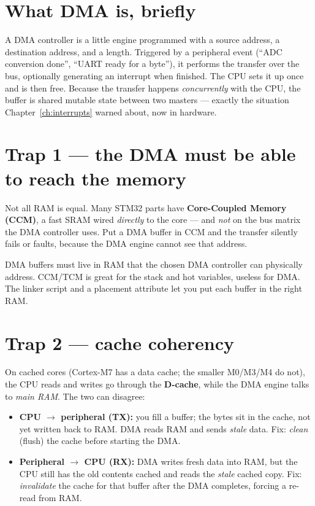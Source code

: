 \documentclass[11pt,a4paper,oneside]{book}
\begin{document}
\section{What DMA is, briefly}
A DMA controller is a little engine programmed with a source address, a
destination address, and a length. Triggered by a peripheral event (``ADC
conversion done'', ``UART ready for a byte''), it performs the transfer over the
bus, optionally generating an interrupt when finished. The CPU sets it up once
and is then free. Because the transfer happens \emph{concurrently} with the CPU,
the buffer is shared mutable state between two masters --- exactly the situation
Chapter~\ref{ch:interrupts} warned about, now in hardware.

\section{Trap 1 --- the DMA must be able to reach the memory}
Not all RAM is equal. Many STM32 parts have \textbf{Core-Coupled Memory (CCM)},
a fast SRAM wired \emph{directly} to the core --- and \emph{not} on the bus
matrix the DMA controller uses. Put a DMA buffer in CCM and the transfer
silently fails or faults, because the DMA engine cannot see that address.
\begin{keyidea}
DMA buffers must live in RAM that the chosen DMA controller can physically
address. CCM/TCM is great for the stack and hot variables, useless for DMA. The
linker script and a placement attribute let you put each buffer in the right
RAM.
\end{keyidea}

\section{Trap 2 --- cache coherency}
On cached cores (Cortex-M7 has a data cache; the smaller M0/M3/M4 do not), the
CPU reads and writes go through the \textbf{D-cache}, while the DMA engine talks
to \emph{main RAM}. The two can disagree:
\begin{itemize}[leftmargin=1.4cm]
  \item \textbf{CPU $\to$ peripheral (TX):} you fill a buffer; the bytes sit in
        the cache, not yet written back to RAM. DMA reads RAM and sends
        \emph{stale} data. Fix: \emph{clean} (flush) the cache before starting
        the DMA.
  \item \textbf{Peripheral $\to$ CPU (RX):} DMA writes fresh data into RAM, but
        the CPU still has the old contents cached and reads the \emph{stale}
        cached copy. Fix: \emph{invalidate} the cache for that buffer after the
        DMA completes, forcing a re-read from RAM.
\end{itemize}
\end{document}

